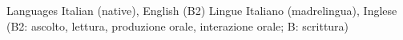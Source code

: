 
\ifenglish
\cvskill
{Languages} %
{Italian (native), English (B2)}
\else
\cvskill
{Lingue} %
{Italiano (madrelingua), Inglese (B2: ascolto, lettura, produzione orale, interazione orale; B: scrittura)} %
\fi




